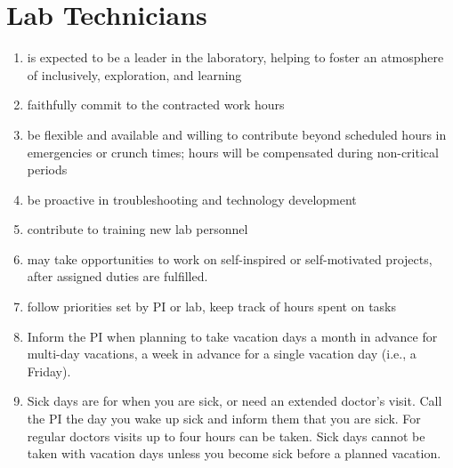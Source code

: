 \documentclass[12pt]{article}
\begin{document}
\section{Lab Technicians}
\begin{enumerate}
\item is expected to be a leader in the laboratory, helping to foster
  an atmosphere of inclusively, exploration, and learning
\item faithfully commit to the contracted work hours
\item be flexible and available and willing to contribute beyond
  scheduled hours in emergencies or crunch times; hours will be
  compensated during non-critical periods
\item be proactive in troubleshooting and technology development
\item contribute to training new lab personnel
\item may take opportunities to work on self-inspired or self-motivated
  projects, after assigned duties are fulfilled.
\item follow priorities set by PI or lab, keep track of hours spent on
  tasks
\item Inform the PI when planning to take vacation days a month in
  advance for multi-day vacations, a week in advance for a single
  vacation day (i.e., a Friday).
\item Sick days are for when you are sick, or need an extended
  doctor's visit. Call the PI the day you wake up sick and inform
  them that you are sick. For regular doctors
  visits up to four hours can be taken. Sick days cannot be taken
  with vacation days unless you become sick before a planned
  vacation. 
\end{enumerate}
\end{document}
